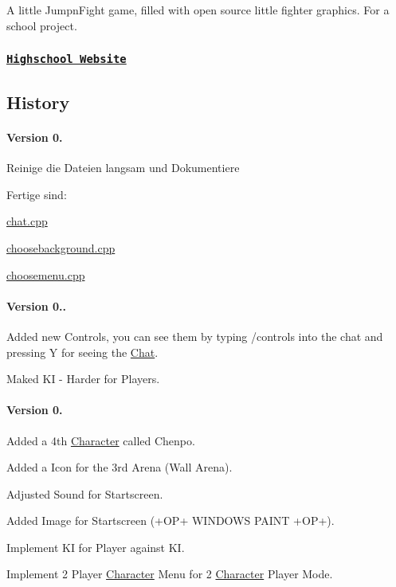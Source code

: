 A little Jump\textquotesingle{}n\textquotesingle{}Fight game, filled with open source little fighter graphics. For a school project.

\subsubsection*{\href{http://www.htw-berlin.de/}{\tt Highschool Website}}

\subsection*{History}

\paragraph*{Version 0.}

Reinige die Dateien langsam und Dokumentiere

Fertige sind\+:

\hyperlink{chat_8cpp_source}{chat.\+cpp}

\hyperlink{choosebackground_8cpp_source}{choosebackground.\+cpp}

\hyperlink{choosemenu_8cpp_source}{choosemenu.\+cpp}

\paragraph*{Version 0..}

Added new Controls, you can see them by typing /controls into the chat and pressing Y for seeing the \hyperlink{class_chat}{Chat}.

Maked K\+I -\/ Harder for Players.

\paragraph*{Version 0.}

Added a 4th \hyperlink{class_character}{Character} called Chenpo.

Added a Icon for the 3rd Arena (Wall Arena).

Adjusted Sound for Startscreen.

Added Image for Startscreen (+\+O\+P+ W\+I\+N\+D\+O\+W\+S P\+A\+I\+N\+T +\+O\+P+).

Implement K\+I for Player against K\+I.

Implement 2 Player \hyperlink{class_character}{Character} Menu for 2 \hyperlink{class_character}{Character} Player Mode.

